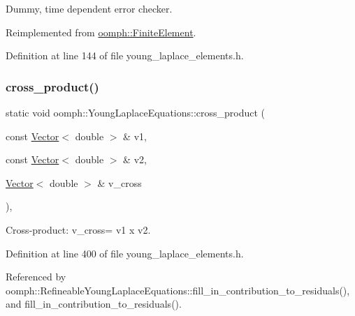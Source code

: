 Dummy, time dependent error checker. 



Reimplemented from \hyperlink{classoomph_1_1FiniteElement_a7f67853506dc73fa6b7505108de22d1f}{oomph\+::\+Finite\+Element}.



Definition at line 144 of file young\+\_\+laplace\+\_\+elements.\+h.

\mbox{\label{classoomph_1_1YoungLaplaceEquations_abca184b7f327333dc4284096d94e4771}} 
\subsubsection{\texorpdfstring{cross\+\_\+product()}{cross\_product()}}
{\footnotesize\ttfamily static void oomph\+::\+Young\+Laplace\+Equations\+::cross\+\_\+product (\begin{DoxyParamCaption}\item[{const \hyperlink{classoomph_1_1Vector}{Vector}$<$ double $>$ \&}]{v1,  }\item[{const \hyperlink{classoomph_1_1Vector}{Vector}$<$ double $>$ \&}]{v2,  }\item[{\hyperlink{classoomph_1_1Vector}{Vector}$<$ double $>$ \&}]{v\+\_\+cross }\end{DoxyParamCaption})\hspace{0.3cm}{\ttfamily [inline]}, {\ttfamily [static]}}



Cross-\/product\+: v\+\_\+cross= v1 x v2. 



Definition at line 400 of file young\+\_\+laplace\+\_\+elements.\+h.



Referenced by oomph\+::\+Refineable\+Young\+Laplace\+Equations\+::fill\+\_\+in\+\_\+contribution\+\_\+to\+\_\+residuals(), and fill\+\_\+in\+\_\+contribution\+\_\+to\+\_\+residuals().

\mbox{\label{classoomph_1_1YoungLaplaceEquations_a948eaebd24c03d70bf1a6d2da775b008}} 
